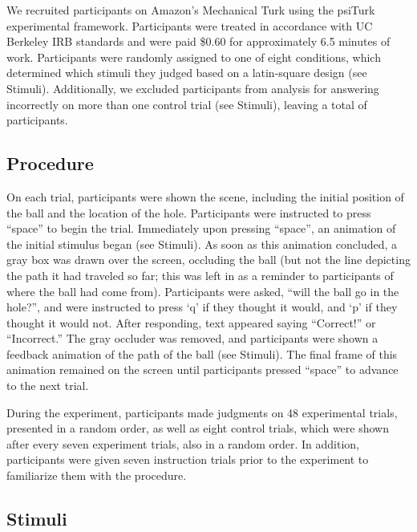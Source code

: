 \documentclass[10pt,letterpaper]{article}
\begin{document}
We recruited \HoleNumComplete{} participants on Amazon's Mechanical Turk using the psiTurk \cite{McDonnell12} experimental framework.
Participants were treated in accordance with UC Berkeley IRB standards and were paid \$0.60 for approximately 6.5 minutes of work.
Participants were randomly assigned to one of eight conditions, which determined which stimuli they judged based on a latin-square design (see Stimuli). 
Additionally, we excluded \HoleNumFailed{} participants from analysis for answering incorrectly on more than one control trial (see Stimuli), leaving a total of \HoleNumOk{} participants.

\subsection{Procedure}

On each trial, participants were shown the scene, including the initial position of the ball and the location of the hole. 
Participants were instructed to press ``space'' to begin the trial. 
Immediately upon pressing ``space'', an animation of the initial stimulus began (see Stimuli). 
As soon as this animation concluded, a gray box was drawn over the screen, occluding the ball (but not the line depicting the path it had traveled so far; this was left in as a reminder to participants of where the ball had come from). 
Participants were asked, ``will the ball go in the hole?'', and were instructed to press `q' if they thought it would, and `p' if they thought it would not. 
After responding, text appeared saying ``Correct!'' or ``Incorrect.''
The gray occluder was removed, and participants were shown a feedback animation of the path of the ball (see Stimuli).
The final frame of this animation remained on the screen until participants pressed ``space'' to advance to the next trial.

During the experiment, participants made judgments on 48 experimental trials, presented in a random order, as well as eight control trials, which were shown after every seven experiment trials, also in a random order.
In addition, participants were given seven instruction trials prior to the experiment to familiarize them with the procedure.

\subsection{Stimuli}
\end{document}
